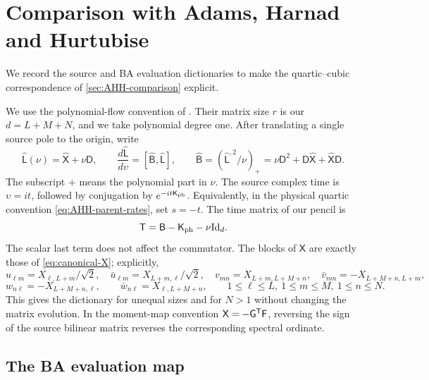 \section{Comparison with Adams, Harnad and Hurtubise}
\label{sec:AHH-dictionary}

We record the source and BA evaluation dictionaries to make the
quartic--cubic correspondence of \cref{sec:AHH-comparison} explicit.

We use the polynomial-flow convention of
\cite[equation (2.1)]{AdamsHarnadHurtubise1990II}. Their matrix size
$r$ is our $d=L+M+N$, and we take polynomial degree one. After
translating a single source pole to the origin, write
\begin{equation}\label{eq:AHH-source-flow}
 \widehat{\mathsf L}(\nu)=\widehat{\mathsf X}+\nu\mathsf D,
 \qquad
 \frac{d\widehat{\mathsf L}}{d\upsilon}
   =[\widehat{\mathsf B},\widehat{\mathsf L}],\qquad
 \widehat{\mathsf B}
   =(\widehat{\mathsf L}^{,2}/\nu)_+
   =\nu\mathsf D^2+\mathsf D\widehat{\mathsf X}
                           +\widehat{\mathsf X}\mathsf D.
\end{equation}
The subscript $+$ means the polynomial part in $\nu$.
The source complex time is $\upsilon=it$, followed by conjugation
by $e^{-it\mathsf K_{\rm ph}}$. Equivalently, in the physical
quartic convention \cref{eq:AHH-parent-rates}, set $s=-t$.
The time matrix of our pencil is
\begin{equation}\label{eq:AHH-source-time}
 \mathsf T=\mathsf B-\mathsf K_{\rm ph}-\nu\mathrm{Id}_d.
\end{equation}
The scalar last term does not affect the commutator. The blocks of
$\mathsf X$ are exactly those of \cref{eq:canonical-X}; explicitly,
\[
 u_{\ell m}=X_{\ell,L+m}/\sqrt2,\quad
 \bar u_{\ell m}=X_{L+m,\ell}/\sqrt2,\quad
 v_{mn}=X_{L+m,L+M+n},\quad
 \bar v_{mn}=-X_{L+M+n,L+m},
\]
\[
 w_{n\ell}=-X_{L+M+n,\ell},\qquad
 \bar w_{n\ell}=X_{\ell,L+M+n},
 \qquad1\leq\ell\leq L,\ 1\leq m\leq M,\ 1\leq n\leq N.
\]
This gives the dictionary for unequal sizes and for $N>1$ without
changing the matrix evolution. In the moment-map convention
$\mathsf X=-\mathsf G^{\mathsf T}\mathsf F$, reversing the sign of the
source bilinear matrix reverses the corresponding spectral ordinate.

\subsection*{The BA evaluation map}

